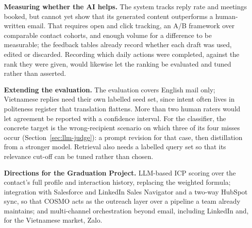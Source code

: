 \textbf{Measuring whether the AI helps.} The system tracks reply rate and
meetings booked, but cannot yet show that its generated content outperforms a
human-written email. That requires open and click tracking, an A/B framework over comparable contact cohorts, and enough
volume for a difference to be measurable; the feedback tables already record
whether each draft was used, edited or discarded. Recording which daily actions
were completed, against the rank they were given, would likewise let the ranking
be evaluated and tuned rather than asserted.

\textbf{Extending the evaluation.} The evaluation covers English mail only;
Vietnamese replies need their own labelled seed set, since intent often lives in
politeness register that translation flattens. More than two human raters would
let agreement be reported with a confidence interval. For the classifier, the
concrete target is the wrong-recipient scenario on which three of its four
misses occur (Section~\ref{sec:llm-judge}): a prompt revision for that case, then
distillation from a stronger model. Retrieval also needs a labelled query set so
that its relevance cut-off can be tuned rather than chosen.

\textbf{Directions for the Graduation Project.} LLM-based ICP scoring over the
contact's full profile and interaction history, replacing the weighted formula;
integration with Salesforce and LinkedIn Sales Navigator and a two-way
HubSpot sync, so that COSMO acts as the outreach layer over a pipeline a team
already maintains; and multi-channel orchestration
beyond email, including LinkedIn and, for the Vietnamese market, Zalo.


\clearpage

